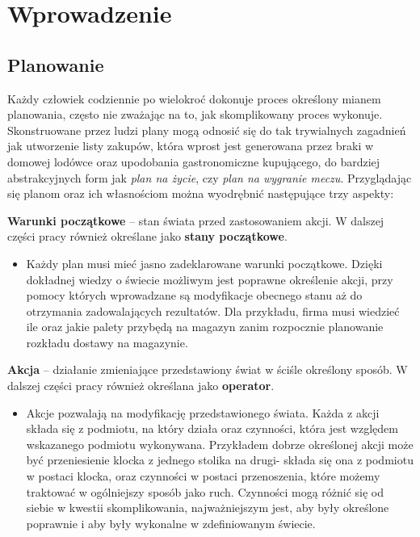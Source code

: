 \chapter{Wprowadzenie}
\thispagestyle{chapterBeginStyle}
\label{rozdzial1}
\section{Planowanie}

    Każdy człowiek codziennie po wielokroć dokonuje proces określony mianem planowania, często nie zważając na to, jak skomplikowany proces wykonuje.
    Skonstruowane przez ludzi plany mogą odnosić się do tak trywialnych zagadnień jak utworzenie listy zakupów, która wprost jest generowana przez braki
    w domowej lodówce oraz upodobania gastronomiczne kupującego, do bardziej abstrakcyjnych form jak \textit{plan na życie}, czy \textit{plan na wygranie meczu}.
    Przyglądając się planom oraz ich własnościom można wyodrębnić następujące trzy aspekty:
    \begin{definition}
    \label{StanyPoczatkowe}
        \textbf{Warunki początkowe} -- stan świata przed zastosowaniem akcji. W dalszej części pracy również określane jako 
        \textbf{stany początkowe}.
    \end{definition}
    \begin{itemize}
        \item Każdy plan musi mieć jasno zadeklarowane warunki początkowe.
        Dzięki dokładnej wiedzy o świecie możliwym jest poprawne określenie akcji, przy pomocy których wprowadzane są modyfikacje
        obecnego stanu aż do otrzymania zadowalających rezultatów. Dla przykładu, firma musi wiedzieć ile oraz jakie palety 
        przybędą na magazyn zanim rozpocznie planowanie rozkładu dostawy na magazynie.
    \end{itemize}
    \begin{definition}
    \label{Akcje}
        \textbf{Akcja} -- działanie zmieniające przedstawiony świat w ściśle określony sposób. W dalszej części pracy również określana jako
        \textbf{operator}.
    \end{definition}
    \begin{itemize}
        \item Akcje pozwalają na modyfikację przedstawionego świata. Każda z akcji składa się z podmiotu, na który działa oraz czynności,
        która jest względem wskazanego podmiotu wykonywana. Przykładem dobrze określonej akcji może być przeniesienie klocka z 
        jednego stolika na drugi- składa się ona z podmiotu w postaci klocka, oraz czynności w postaci przenoszenia, które możemy traktować
        w ogólniejszy sposób jako ruch. Czynności mogą różnić się od siebie w kwestii skomplikowania, najważniejszym jest, aby były określone poprawnie i aby były wykonalne w zdefiniowanym świecie.
    \end{itemize}
